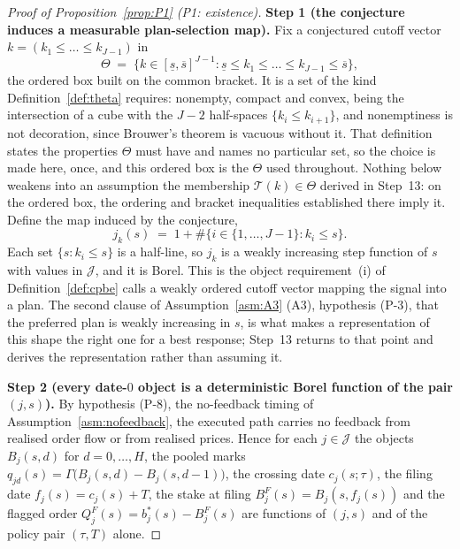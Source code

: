 \documentclass[11pt]{article}
\newcommand{\Tmap}{\mathcal{T}}
\begin{document}
\begin{proof}[Proof of Proposition~\ref{prop:P1} (P1: existence)]
\smallskip
\noindent\textbf{Step 1 (the conjecture induces a measurable plan-selection map).}
Fix a conjectured cutoff vector $k = (k_1 \le \dots \le k_{J-1})$ in
\[
\Theta \;=\; \bigl\{k \in [\underline s,\overline s]^{J-1} :
\underline s \le k_1 \le \dots \le k_{J-1} \le \overline s\bigr\},
\]
the ordered box built on the common bracket. It is a set of the kind Definition~\ref{def:theta}
requires: nonempty, compact and convex, being the intersection of a cube with the $J-2$ half-spaces
$\{k_i \le k_{i+1}\}$, and nonemptiness is not decoration, since Brouwer's theorem is vacuous without
it. That definition states the properties $\Theta$ must have and names no particular set, so the
choice is made here, once, and this ordered box is the $\Theta$ used throughout. Nothing below
weakens into an assumption the membership $\Tmap(k) \in \Theta$ derived in Step~13: on the ordered
box, the ordering and bracket inequalities established there imply it. Define the map induced by the
conjecture,
\begin{equation}
\label{eq:P1-jk}
j_k(s) \;=\; 1 + \#\bigl\{i \in \{1,\dots,J-1\} : k_i \le s\bigr\}.
\end{equation}
Each set $\{s : k_i \le s\}$ is a half-line, so $j_k$ is a weakly increasing step function of $s$
with values in $\mathcal J$, and it is Borel. This is the object requirement~(i) of
Definition~\ref{def:cpbe} calls a weakly ordered cutoff vector mapping the signal into a plan. The
second clause of Assumption~\ref{asm:A3} (A3), hypothesis (P-3), that the preferred plan is weakly
increasing in $s$, is what makes a representation of this shape the right one for a best response;
Step~13 returns to that point and derives the representation rather than assuming it.

\smallskip
\noindent\textbf{Step 2 (every date-$0$ object is a deterministic Borel function of the pair
$(j,s)$).}
By hypothesis (P-8), the no-feedback timing of Assumption~\ref{asm:nofeedback}, the executed path
carries no feedback from realised order flow or from realised prices. Hence for each $j \in
\mathcal J$ the objects $B_j(s,d)$ for $d = 0,\dots,H$, the pooled marks $q_{jd}(s) =
\Gamma\bigl(B_j(s,d)-B_j(s,d-1)\bigr)$, the crossing date $c_j(s;\tau)$, the filing date $f_j(s) =
c_j(s)+T$, the stake at filing $B_j^F(s) = B_j(s,f_j(s))$ and the flagged order $Q_j^F(s) =
b_j^*(s)-B_j^F(s)$ are functions of $(j,s)$ and of the policy pair $(\tau,T)$ alone.


\end{proof}
\end{document}

